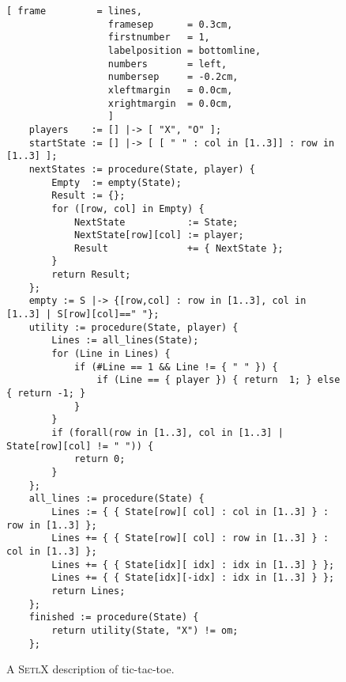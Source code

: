 \begin{figure}[!ht]
\centering
\begin{Verbatim}[ frame         = lines, 
                  framesep      = 0.3cm, 
                  firstnumber   = 1,
                  labelposition = bottomline,
                  numbers       = left,
                  numbersep     = -0.2cm,
                  xleftmargin   = 0.0cm,
                  xrightmargin  = 0.0cm,
                  ]
    players    := [] |-> [ "X", "O" ];
    startState := [] |-> [ [ " " : col in [1..3]] : row in [1..3] ];
    nextStates := procedure(State, player) {
        Empty  := empty(State);
        Result := {};
        for ([row, col] in Empty) {
            NextState           := State;
            NextState[row][col] := player;
            Result              += { NextState };
        }
        return Result;
    };
    empty := S |-> {[row,col] : row in [1..3], col in [1..3] | S[row][col]==" "};
    utility := procedure(State, player) {
        Lines := all_lines(State);
        for (Line in Lines) {
            if (#Line == 1 && Line != { " " }) {
                if (Line == { player }) { return  1; } else { return -1; }
            }
        }
        if (forall(row in [1..3], col in [1..3] | State[row][col] != " ")) {
            return 0;   
        }
    };
    all_lines := procedure(State) {
        Lines := { { State[row][ col] : col in [1..3] } : row in [1..3] };
        Lines += { { State[row][ col] : row in [1..3] } : col in [1..3] };
        Lines += { { State[idx][ idx] : idx in [1..3] } };
        Lines += { { State[idx][-idx] : idx in [1..3] } };
        return Lines;
    };
    finished := procedure(State) {
        return utility(State, "X") != om;
    };
\end{Verbatim}
\vspace*{-0.3cm}
\caption{A \textsc{SetlX} description of tic-tac-toe.}
\label{fig:ttt.stlx}
\end{figure}
 

